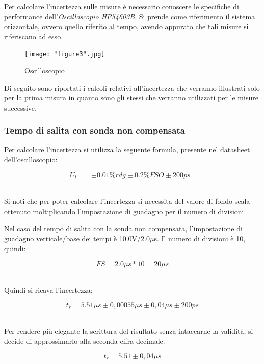 \documentclass[a4paper]{article}
\begin{document}
Per calcolare l'incertezza sulle misure è necessario conoscere le specifiche di performance dell'\emph{Oscilloscopio HP54603B}. Si prende come riferimento il sistema orizzontale, ovvero quello riferito al tempo, avendo appurato che tali misure si riferiscano ad esso.

\begin{figure}[htp]
	\centering
	\texttt{[image: "figure3".jpg]}
	\caption{Oscilloscopio}
	\label{}
\end{figure}

Di seguito sono riportati i calcoli relativi all'incertezza che verranno illustrati solo per la prima misura in quanto sono gli stessi che verranno utilizzati per le misure successive.

\subsubsection{Tempo di salita con sonda non compensata}

Per calcolare l'incertezza si utilizza la seguente formula, presente nel datasheet dell'oscilloscopio:

\begin{Large}
	\begin{equation}
  		U_{t}=[\pm 0.01\%rdg\pm 0.2\%FSO \pm 200ps]
	\end{equation}
\end{Large}\\

Si noti che per poter calcolare l'incertezza si necessita del valore di fondo scala ottenuto moltiplicando l'impostazione di guadagno per il numero di divisioni.

Nel caso del tempo di salita con la sonda non compensata, l'impostazione di guadagno verticale/base dei tempi è 10.0V/2.0$\mu$s.
Il numero di divisioni è 10, quindi:
\begin{Large}
	\begin{equation}
  		FS=2.0\mu s * 10= 20\mu s
	\end{equation}
\end{Large}\\

Quindi si ricava l'incertezza:
\begin{Large}
	\begin{equation}
  		{t_r}= 5.51\mu s \pm 0,00055\mu s \pm0,04\mu s \pm200ps %
	\end{equation}
\end{Large}\\
Per rendere più elegante la scrittura del risultato senza intaccarne la validità, si decide di approssimarlo alla seconda cifra decimale.
\begin{Large}
	\begin{equation}
  		{t_r}= 5.51\pm 0,04 \mu s
	\end{equation}
\end{Large}\\
\end{document}
